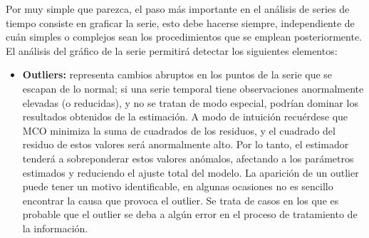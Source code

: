 Por muy simple que parezca, el paso más importante en el análisis de series de tiempo consiste en graficar la serie, esto debe hacerse siempre, independiente de cuán 
simples o complejos sean los procedimientos que se emplean posteriormente. El análisis del gráfico de la serie permitirá detectar los siguientes elementos: 
\begin{itemize}
 \item{\textbf {Outliers:}} representa cambios abruptos en los puntos de la serie que se escapan de lo normal; si una serie temporal tiene observaciones anormalmente elevadas 
  (o reducidas), y no se tratan de modo especial, podrían dominar los resultados obtenidos de la estimación. A modo de intuición recuérdese que MCO minimiza la suma de
  cuadrados de los residuos, y el cuadrado del residuo de estos valores será anormalmente alto. Por lo tanto, el estimador tenderá a sobreponderar estos valores
  anómalos, afectando a los parámetros estimados y reduciendo el ajuste total del modelo. La aparición de un outlier puede tener un motivo identificable, en algunas 
  ocasiones no es sencillo encontrar la causa que provoca el outlier. Se trata de casos en los que es probable que el outlier se deba a algún error en el proceso de 
  tratamiento de la información.
  

\end{itemize}
